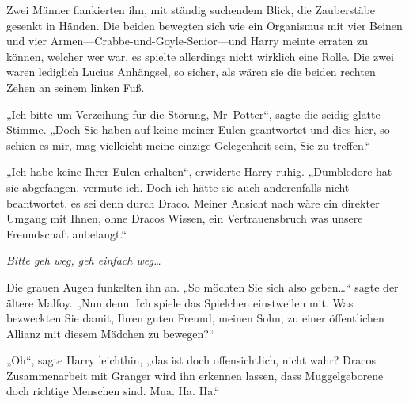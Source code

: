 Zwei Männer flankierten ihn, mit ständig suchendem Blick, die Zauberstäbe gesenkt in Händen. Die beiden bewegten sich wie ein Organismus mit vier Beinen und vier Armen—Crabbe-und-Goyle-Senior—und Harry meinte erraten zu können, welcher wer war, es spielte allerdings nicht wirklich eine Rolle. Die zwei waren lediglich Lucius Anhängsel, so sicher, als wären sie die beiden rechten Zehen an seinem linken Fuß.

„Ich bitte um Verzeihung für die Störung, Mr~Potter“, sagte die seidig glatte Stimme. „Doch Sie haben auf keine meiner Eulen geantwortet und dies hier, so schien es mir, mag vielleicht meine einzige Gelegenheit sein, Sie zu treffen.“

„Ich habe keine Ihrer Eulen erhalten“, erwiderte Harry ruhig. „Dumbledore hat sie abgefangen, vermute ich. Doch ich hätte sie auch anderenfalls nicht beantwortet, es sei denn durch Draco. Meiner Ansicht nach wäre ein direkter Umgang mit Ihnen, ohne Dracos Wissen, ein Vertrauensbruch was unsere Freundschaft anbelangt.“

\emph{Bitte geh weg, geh einfach weg…}

Die grauen Augen funkelten ihn an. „So möchten Sie sich also geben…“ sagte der ältere Malfoy. „Nun denn. Ich spiele das Spielchen einstweilen mit. Was bezweckten Sie damit, Ihren guten Freund, meinen Sohn, zu einer öffentlichen Allianz mit diesem Mädchen zu bewegen?“

„Oh“, sagte Harry leichthin, „das ist doch offensichtlich, nicht wahr? Dracos Zusammenarbeit mit Granger wird ihn erkennen lassen, dass Muggelgeborene doch richtige Menschen sind. Mua. Ha. Ha.“

